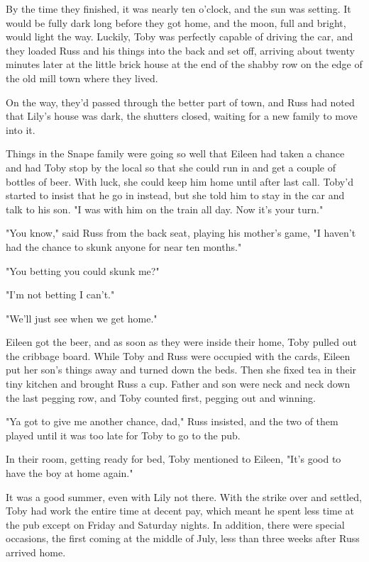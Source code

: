 By the time they finished, it was nearly ten o'clock, and the sun was setting. It would be fully dark long before they got home, and the moon, full and bright, would light the way. Luckily, Toby was perfectly capable of driving the car, and they loaded Russ and his things into the back and set off, arriving about twenty minutes later at the little brick house at the end of the shabby row on the edge of the old mill town where they lived.

On the way, they'd passed through the better part of town, and Russ had noted that Lily's house was dark, the shutters closed, waiting for a new family to move into it.

Things in the Snape family were going so well that Eileen had taken a chance and had Toby stop by the local so that she could run in and get a couple of bottles of beer. With luck, she could keep him home until after last call. Toby'd started to insist that he go in instead, but she told him to stay in the car and talk to his son. "I was with him on the train all day. Now it's your turn."

"You know," said Russ from the back seat, playing his mother's game, "I haven't had the chance to skunk anyone for near ten months."

"You betting you could skunk me?"

"I'm not betting I can't."

"We'll just see when we get home."

Eileen got the beer, and as soon as they were inside their home, Toby pulled out the cribbage board. While Toby and Russ were occupied with the cards, Eileen put her son's things away and turned down the beds. Then she fixed tea in their tiny kitchen and brought Russ a cup. Father and son were neck and neck down the last pegging row, and Toby counted first, pegging out and winning.

"Ya got to give me another chance, dad," Russ insisted, and the two of them played until it was too late for Toby to go to the pub.

In their room, getting ready for bed, Toby mentioned to Eileen, "It's good to have the boy at home again."

It was a good summer, even with Lily not there. With the strike over and settled, Toby had work the entire time at decent pay, which meant he spent less time at the pub except on Friday and Saturday nights. In addition, there were special occasions, the first coming at the middle of July, less than three weeks after Russ arrived home.

